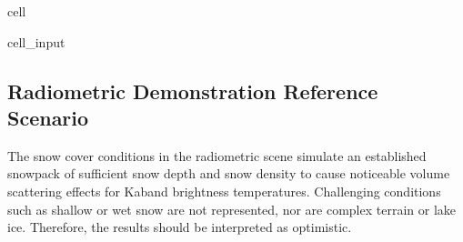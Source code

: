 \documentclass[letterpaper,10pt,english]{jupyterBook}
\begin{document}
\begin{sphinxuseclass}{cell}\begin{sphinxVerbatimInput}

\begin{sphinxuseclass}{cell_input}
\begin{sphinxVerbatim}[commandchars=\\\{\}]
  
  

  
   
\end{sphinxVerbatim}

\end{sphinxuseclass}\end{sphinxVerbatimInput}

\end{sphinxuseclass}

\subsection{Radiometric Demonstration Reference Scenario}
\label{\detokenize{book/algorithm_performance_assessment:radiometric-demonstration-reference-scenario}}
\sphinxAtStartPar
The snow cover conditions in the radiometric scene simulate an established snowpack of sufficient snow depth and snow density to cause noticeable volume scattering effects for Ka\sphinxhyphen{}band brightness temperatures.
Challenging conditions such as shallow or wet snow are not represented, nor are complex terrain or lake ice.
Therefore, the results should be interpreted as optimistic.
\end{document}
